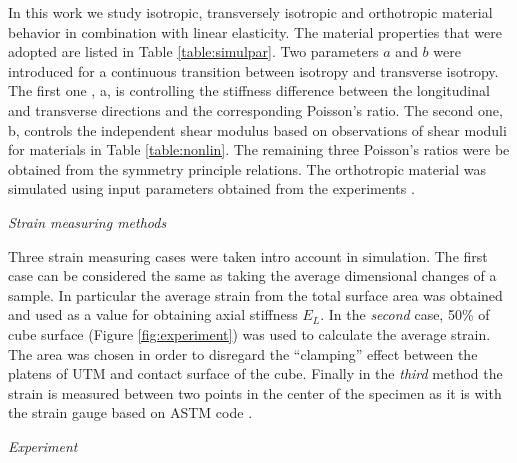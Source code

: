 \documentclass[review]{elsarticle}
\begin{document}
In this work we study isotropic, transversely isotropic and orthotropic material behavior 
in combination with linear elasticity.
The material properties that were adopted are listed in
Table \ref{table:simulpar}. Two parameters $a$ and $b$ were introduced for a continuous transition between isotropy and transverse isotropy. 
The first one , a, is controlling the stiffness difference between the longitudinal and transverse directions and the corresponding Poisson's ratio. 
The second one, b, controls the independent shear modulus based on observations
of shear moduli for materials in Table \ref{table:nonlin}.
The remaining three Poisson's ratios were be obtained from the symmetry
principle relations. The orthotropic material was simulated using input
parameters obtained from the experiments \cite{vorobyevcharacterisation}.


\begin{description}
\item{\textit{Strain measuring methods}}
\end{description}


Three strain measuring cases were taken intro account in simulation. The first
case can be considered the same as taking the average dimensional changes of a
sample. In particular the average strain from the total surface area was
obtained and used as a value for obtaining axial stiffness $E_L$. In the
\textit{second} case, 50\% of cube surface (Figure \ref{fig:experiment}) was used to calculate the
 average strain. The area was chosen in order to disregard the ``clamping''
 effect between the platens of UTM and contact surface of the cube. Finally in
 the \textit{third} method the strain is measured between two points in the
 center of the specimen as it is with the strain gauge based on ASTM code \cite{american2009standard}.

\begin{description}
\item{\textit{Experiment}}
\end{description}
\end{document}
